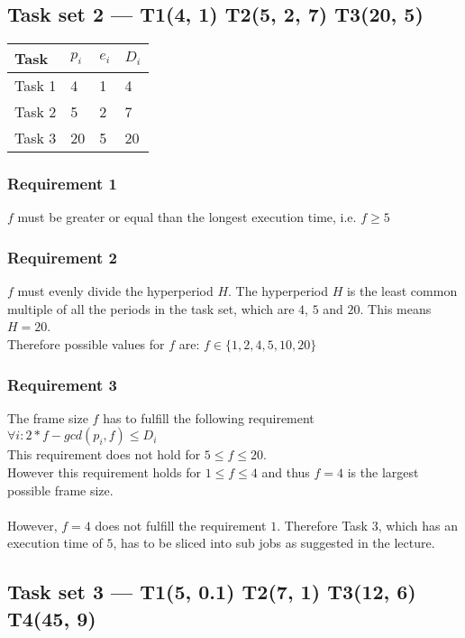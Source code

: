 \documentclass{article}
\begin{document}
\subsection{Task set 2 --- T1(4, 1) T2(5, 2, 7) T3(20, 5)}

\begin{tabular}{|l||l|l|l|}
\hline
Task   & $p_i$ & $e_i$ & $D_i$ \\
\hline
\hline
Task 1 & 4 & 1 & 4 \\
\hline
Task 2 & 5 & 2 & 7 \\
\hline
Task 3 & 20 & 5 & 20 \\
\hline
\end{tabular}

\subsubsection{Requirement 1}
$f$ must be greater or equal than the longest execution time, i.e. $f \geq 5$

\subsubsection{Requirement 2}
$f$ must evenly divide the hyperperiod $H$. The hyperperiod $H$ is the least common multiple of
all the periods in the task set, which are $4$, $5$ and $20$. This means $H = 20$. \\
Therefore possible values for $f$ are: $f \in \{1, 2, 4, 5, 10, 20\}$

\subsubsection{Requirement 3}
The frame size $f$ has to fulfill the following requirement $\forall i: 2*f-gcd(p_i,f) \leq D_i$ \\
This requirement does not hold for $5 \leq f \leq 20$. \\
However this requirement holds for $1 \leq f \leq 4$ and thus $f = 4$ is the
largest possible frame size. \\
\\
However, $f = 4$ does not fulfill the requirement $1$.
Therefore Task 3, which has an execution time of $5$,
has to be sliced into sub jobs as suggested in the lecture.


\subsection{Task set 3 --- T1(5, 0.1) T2(7, 1) T3(12, 6) T4(45, 9)}
\end{document}
